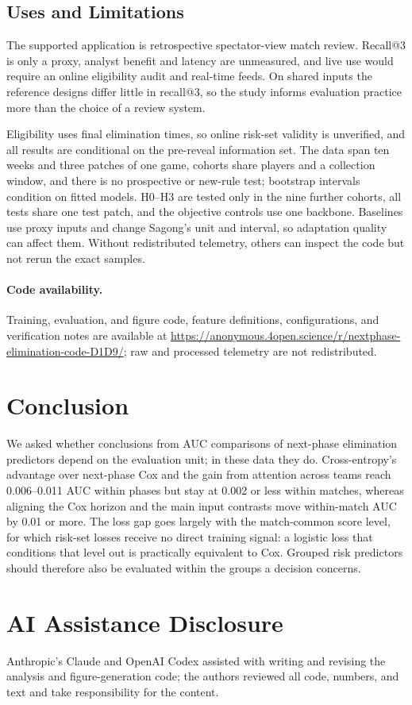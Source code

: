 \documentclass[sigconf,anonymous]{acmart}
\newcommand{\artifacturl}{\url{https://anonymous.4open.science/r/nextphase-elimination-code-D1D9/}}
\begin{document}
\subsection{Uses and Limitations}
\label{sec:discussion:limits}
The supported application is retrospective spectator-view match review. Recall@3 is only a proxy, analyst benefit and latency are unmeasured, and live use would require an online eligibility audit and real-time feeds. On shared inputs the reference designs differ little in recall@3, so the study informs evaluation practice more than the choice of a review system.

Eligibility uses final elimination times, so online risk-set validity is unverified, and all results are conditional on the pre-reveal information set. The data span ten weeks and three patches of one game, cohorts share players and a collection window, and there is no prospective or new-rule test; bootstrap intervals condition on fitted models. H0--H3 are tested only in the nine further cohorts, all tests share one test patch, and the objective controls use one backbone. Baselines use proxy inputs and change Sagong's unit and interval, so adaptation quality can affect them. Without redistributed telemetry, others can inspect the code but not rerun the exact samples.

\paragraph{Code availability.}
Training, evaluation, and figure code, feature definitions, configurations, and verification notes are available at \artifacturl{}; raw and processed telemetry are not redistributed.

\section{Conclusion}
\label{sec:conclusion}
We asked whether conclusions from AUC comparisons of next-phase elimination predictors depend on the evaluation unit; in these data they do. Cross-entropy's advantage over next-phase Cox and the gain from attention across teams reach 0.006--0.011 AUC within phases but stay at 0.002 or less within matches, whereas aligning the Cox horizon and the main input contrasts move within-match AUC by 0.01 or more. The loss gap goes largely with the match-common score level, for which risk-set losses receive no direct training signal: a logistic loss that conditions that level out is practically equivalent to Cox. Grouped risk predictors should therefore also be evaluated within the groups a decision concerns.

\section*{AI Assistance Disclosure}
Anthropic's Claude and OpenAI Codex assisted with writing and revising the analysis and figure-generation code; the authors reviewed all code, numbers, and text and take responsibility for the content.



\end{document}

